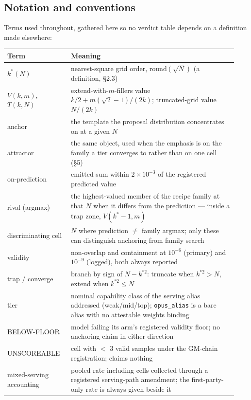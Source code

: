 \subsection{Notation and conventions}

Terms used throughout, gathered here so no verdict table depends on a definition made
elsewhere:

\begin{center}
\begin{small}
\begin{tabular}{@{}p{0.26\linewidth}p{0.68\linewidth}@{}}
\toprule
Term & Meaning \\
\midrule
$k^*(N)$ & nearest-square grid order, $\mathrm{round}(\sqrt{N})$ (a definition, \S2.3) \\
$V(k, m)$, $T(k, N)$ & extend-with-$m$-fillers value $k/2 + m(\sqrt{2}-1)/(2k)$; truncated-grid value $N/(2k)$ \\
anchor & the template the proposal distribution concentrates on at a given $N$ \\
attractor & the same object, used when the emphasis is on the family a tier converges to rather than on one cell (\S5) \\
on-prediction & emitted sum within $2\times10^{-3}$ of the registered predicted value \\
rival (argmax) & the highest-valued member of the recipe family at that $N$ when it differs from the prediction --- inside a trap zone, $V(k^*{-}1, m)$ \\
discriminating cell & $N$ where prediction $\ne$ family argmax; only these can distinguish anchoring from family search \\
validity & non-overlap and containment at $10^{-6}$ (primary) and $10^{-9}$ (logged), both always reported \\
trap / converge & branch by sign of $N - k^{*2}$: truncate when $k^{*2} > N$, extend when $k^{*2} \le N$ \\
tier & nominal capability class of the serving alias addressed (weak/mid/top); \texttt{opus\_alias} is a bare alias with no attestable weights binding \\
BELOW-FLOOR & model failing its arm's registered validity floor; no anchoring claim in either direction \\
UNSCOREABLE & cell with $<$ 3 valid samples under the GM-chain registration; claims nothing \\
mixed-serving accounting & pooled rate including cells collected through a registered serving-path amendment; the first-party-only rate is always given beside it \\
\bottomrule
\end{tabular}
\end{small}
\end{center}
